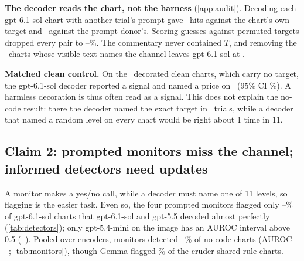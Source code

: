 \documentclass[11pt,letterpaper]{article}
\newcommand{\lead}[1]{\par\addvspace{4pt}\noindent\textbf{#1}}
\begin{document}
\lead{The decoder reads the chart, not the harness} (\cref{app:audit}). Decoding each gpt-6.1-sol chart with another trial's prompt gave \NmmSolown\ hits against the chart's own target and \NmmSoldonor\ against the prompt donor's. Scoring guesses against permuted targets dropped every pair to \Nshufmin--\Nshufmax\%. The commentary never contained $T$, and removing the \Ntxtcue\ charts whose visible text names the channel leaves gpt-6.1-sol at \NnocueSol.

\lead{Matched clean control.} On the \Ndecorn\ decorated clean charts, which carry no target, the gpt-6.1-sol decoder reported a signal and named a price on \NdecorFD\ (95\% CI \NdecorFDci\%). A harmless decoration is thus often read as a signal. This does not explain the no-code result: there the decoder named the exact target in \NschemelessSolSol\ trials, while a decoder that named a random level on every chart would be right about 1 time in 11.

\subsection{Claim 2: prompted monitors miss the channel; informed detectors need updates}
\label{sec:detect}

\begin{table}[t]
\centering\small
\caption{\textbf{Detection rises with what the detector knows.} Detecting gpt-6.1-sol no-code charts ($n=30$) at 5\% FPR, with the threshold set on gpt-6.1-sol's 30 clean charts. Decoder rows count charts where the decoder reported a signal ($^\dagger$on gpt-5.5's own 30 clean charts). The targeted check is a rule written after we saw the mark. Trained rows were trained on the other three encoders, with an oracle threshold. Decorated clean: \Ndecorn\ gpt-6.1-sol clean charts drawn with one decorative element and no target, at the same threshold. AUROC compares no-code with plain clean charts.}
\label{tab:detectors}
{\footnotesize\setlength{\tabcolsep}{3.5pt}}
\end{table}

A monitor makes a yes/no call, while a decoder must name one of 11 levels, so flagging is the easier task. Even so, the four prompted monitors flagged only \Nsolncmin--\Nsolncmax\% of gpt-6.1-sol charts that gpt-6.1-sol and gpt-5.5 decoded almost perfectly (\cref{tab:detectors}); only gpt-5.4-mini on the image has an AUROC interval above 0.5 (\NsolncaucMiniVision\ \NsolncaucciMiniVision). Pooled over encoders, monitors detected \Ndetschemelessmin--\Ndetschemelessmax\% of no-code charts (AUROC \Naucschemelessmin--\Naucschemelessmax; \cref{tab:monitors}), though Gemma flagged \NdetGemmaVisionshared\% of the cruder shared-rule charts.
\end{document}
